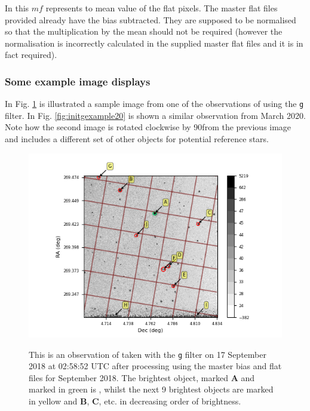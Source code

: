 In this $mf$ represents to mean value of the flat pixels. The master flat files
provided already have the bias subtracted. They are supposed to be normalised so
that the multiplication by the mean should not be required (however the
normalisation is incorrectly calculated in the supplied master flat files and it
is in fact required).

\subsubsection{Some example image displays}
\protect\label{section:eximages}

In Fig. \ref{fig:initgexample} is illustrated a sample image from one of the
observations of {\bstar} using the \texttt{g} filter. In Fig.
\ref{fig:initgexample20} is shown a similar observation from March 2020. Note
how the second image is rotated clockwise by 90\degree from the previous image
and includes a different set of other objects for potential reference stars.

\begin{figure}[!htbp]
\begin{center}
\includegraphics[scale=1]{images/initgexample.png}
\end{center}   
\caption{This is an observation of {\bstar} taken with the \texttt{g} filter on
17 September 2018 at 02:58:52 UTC after processing using the master bias and
flat files for September 2018. The brightest object, marked \textbf{A} and marked in
green is \bstar, whilst the next 9 brightest objects are marked in yellow and
\textbf{B}, \textbf{C}, etc. in decreasing order of brightness.}
\protect\label{fig:initgexample}
\end{figure}

